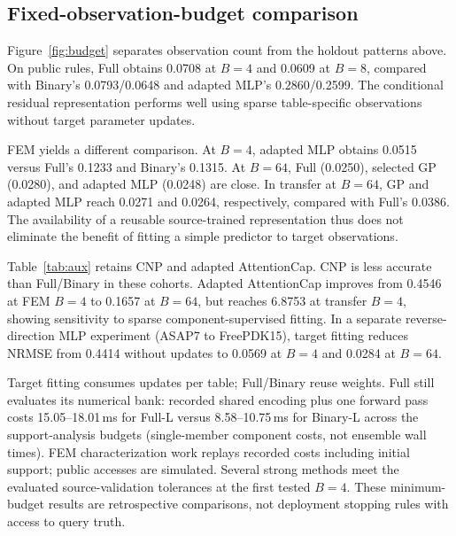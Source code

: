 \documentclass[conference,9pt,letterpaper]{IEEEtran}
\begin{document}
\subsection{Fixed-observation-budget comparison}

Figure~\ref{fig:budget} separates observation count from the holdout patterns above. On public rules, Full obtains 0.0708 at $B=4$ and 0.0609 at $B=8$, compared with Binary's 0.0793/0.0648 and adapted MLP's 0.2860/0.2599. The conditional residual representation performs well using sparse table-specific observations without target parameter updates.

FEM yields a different comparison. At $B=4$, adapted MLP obtains 0.0515 versus Full's 0.1233 and Binary's 0.1315. At $B=64$, Full (0.0250), selected GP (0.0280), and adapted MLP (0.0248) are close. In transfer at $B=64$, GP and adapted MLP reach 0.0271 and 0.0264, respectively, compared with Full's 0.0386. The availability of a reusable source-trained representation thus does not eliminate the benefit of fitting a simple predictor to target observations.

\begin{table}[t]
\centering\caption{Additional fixed-budget controls, pooled-replicate macro NRMSE. AC denotes component-supervised adapted AttentionCap. Dashes mark unavailable or infeasible evaluations. These AC results evaluate the stated rule-completion adaptation, rather than rank the original capacitance-matrix task.}
\label{tab:aux}\small\setlength{\tabcolsep}{2pt}
\end{table}
Table~\ref{tab:aux} retains CNP and adapted AttentionCap. CNP is less accurate than Full/Binary in these cohorts. Adapted AttentionCap improves from 0.4546 at FEM $B=4$ to 0.1657 at $B=64$, but reaches 6.8753 at transfer $B=4$, showing sensitivity to sparse component-supervised fitting. In a separate reverse-direction MLP experiment (ASAP7 to FreePDK15), target fitting reduces NRMSE from 0.4414 without updates to 0.0569 at $B=4$ and 0.0284 at $B=64$.

Target fitting consumes updates per table; Full/Binary reuse weights. Full still evaluates its numerical bank: recorded shared encoding plus one forward pass costs 15.05--18.01\,ms for Full-L versus 8.58--10.75\,ms for Binary-L across the support-analysis budgets (single-member component costs, not ensemble wall times). FEM characterization work replays recorded costs including initial support; public accesses are simulated. Several strong methods meet the evaluated source-validation tolerances at the first tested $B=4$. These minimum-budget results are retrospective comparisons, not deployment stopping rules with access to query truth.
\end{document}
